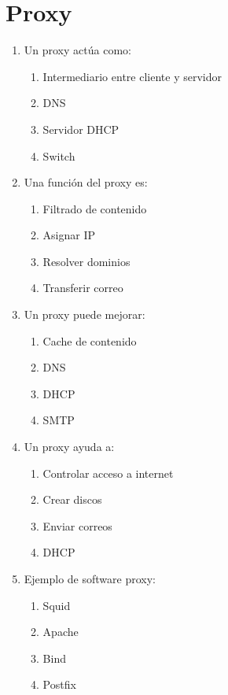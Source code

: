 \documentclass[12pt]{article}
\begin{document}
\section*{Proxy}

\begin{enumerate}[label=\textbf{Proxy-\arabic*.}]

\item Un proxy actúa como:
\begin{enumerate}[label=\alph*)]
\item Intermediario entre cliente y servidor
\item DNS
\item Servidor DHCP
\item Switch
\end{enumerate}

\item Una función del proxy es:
\begin{enumerate}[label=\alph*)]
\item Filtrado de contenido
\item Asignar IP
\item Resolver dominios
\item Transferir correo
\end{enumerate}

\item Un proxy puede mejorar:
\begin{enumerate}[label=\alph*)]
\item Cache de contenido
\item DNS
\item DHCP
\item SMTP
\end{enumerate}

\item Un proxy ayuda a:
\begin{enumerate}[label=\alph*)]
\item Controlar acceso a internet
\item Crear discos
\item Enviar correos
\item DHCP
\end{enumerate}

\item Ejemplo de software proxy:
\begin{enumerate}[label=\alph*)]
\item Squid
\item Apache
\item Bind
\item Postfix
\end{enumerate}

\end{enumerate}
\end{document}
